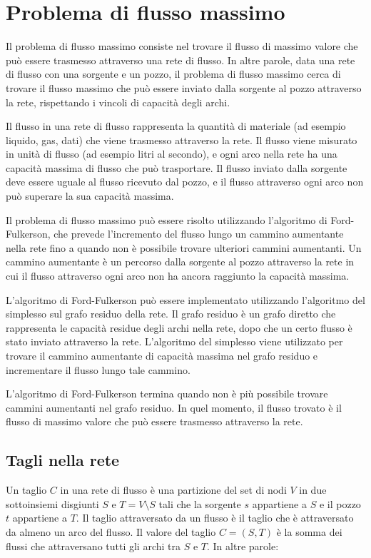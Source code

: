 \section{Problema di flusso massimo}

Il problema di flusso massimo consiste nel trovare il flusso di massimo valore che può essere trasmesso attraverso una rete di flusso. In altre parole, data una rete di flusso con una sorgente e un pozzo, il problema di flusso massimo cerca di trovare il flusso massimo che può essere inviato dalla sorgente al pozzo attraverso la rete, rispettando i vincoli di capacità degli archi.

Il flusso in una rete di flusso rappresenta la quantità di materiale (ad esempio liquido, gas, dati) che viene trasmesso attraverso la rete. Il flusso viene misurato in unità di flusso (ad esempio litri al secondo), e ogni arco nella rete ha una capacità massima di flusso che può trasportare. Il flusso inviato dalla sorgente deve essere uguale al flusso ricevuto dal pozzo, e il flusso attraverso ogni arco non può superare la sua capacità massima.

Il problema di flusso massimo può essere risolto utilizzando l'algoritmo di Ford-Fulkerson, che prevede l'incremento del flusso lungo un cammino aumentante nella rete fino a quando non è possibile trovare ulteriori cammini aumentanti. Un cammino aumentante è un percorso dalla sorgente al pozzo attraverso la rete in cui il flusso attraverso ogni arco non ha ancora raggiunto la capacità massima.

L'algoritmo di Ford-Fulkerson può essere implementato utilizzando l'algoritmo del simplesso sul grafo residuo della rete. Il grafo residuo è un grafo diretto che rappresenta le capacità residue degli archi nella rete, dopo che un certo flusso è stato inviato attraverso la rete. L'algoritmo del simplesso viene utilizzato per trovare il cammino aumentante di capacità massima nel grafo residuo e incrementare il flusso lungo tale cammino.

L'algoritmo di Ford-Fulkerson termina quando non è più possibile trovare cammini aumentanti nel grafo residuo. In quel momento, il flusso trovato è il flusso di massimo valore che può essere trasmesso attraverso la rete.

\subsection{Tagli nella rete}

Un taglio $C$ in una rete di flusso è una partizione del set di nodi $V$ in due sottoinsiemi disgiunti $S$ e $T=V\setminus S$ tali che la sorgente $s$ appartiene a $S$ e il pozzo $t$ appartiene a $T$. Il taglio attraversato da un flusso è il taglio che è attraversato da almeno un arco del flusso. Il valore del taglio $C=(S,T)$ è la somma dei flussi che attraversano tutti gli archi tra $S$ e $T$. In altre parole:

